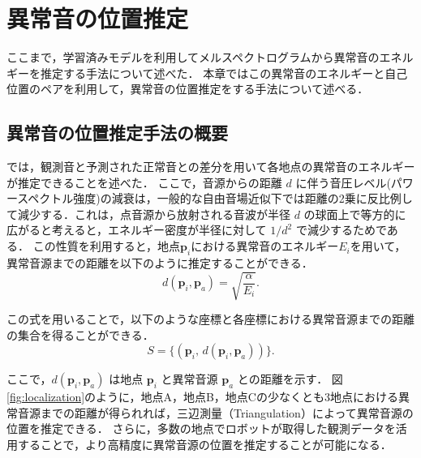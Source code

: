 \documentclass[../main]{subfiles}
\begin{document}
\section{異常音の位置推定}
\label{sec:pmethod_abnormal_detection}
ここまで，学習済みモデルを利用してメルスペクトログラムから異常音のエネルギーを推定する手法について述べた．
本章ではこの異常音のエネルギーと自己位置のペアを利用して，異常音の位置推定をする手法について述べる．

\subsection{異常音の位置推定手法の概要}
では，観測音と予測された正常音との差分を用いて各地点の異常音のエネルギーが推定できることを述べた．
ここで，音源からの距離 $d$ に伴う音圧レベル(パワースペクトル強度)の減衰は，一般的な自由音場近似下では距離の2乗に反比例して減少する．これは，点音源から放射される音波が半径 $d$ の球面上で等方的に広がると考えると，エネルギー密度が半径に対して $1/d^2$ で減少するためである．
この性質を利用すると，地点$\mathbf{p}_i$における異常音のエネルギー$E_i$を用いて，異常音源までの距離を以下のように推定することができる．
\begin{equation}
    d(\mathbf{p}_i, \mathbf{p}_a) = \sqrt{\frac{\alpha}{E_i}}.
    \label{eq:distance}
\end{equation}

この式を用いることで，以下のような座標と各座標における異常音源までの距離の集合を得ることができる．
\begin{equation}
    S = \{ (\mathbf{p}_i, \, d(\mathbf{p}_i,\mathbf{p}_a)) \}.
\end{equation}

ここで，$d(\mathbf{p}_i,\mathbf{p}_a)$ は地点 $\mathbf{p}_i$ と異常音源 $\mathbf{p}_a$ との距離を示す．
図\ref{fig:localization}のように，地点A，地点B，地点Cの少なくとも3地点における異常音源までの距離が得られれば，三辺測量（Triangulation）によって異常音源の位置を推定できる．
さらに，多数の地点でロボットが取得した観測データを活用することで，より高精度に異常音源の位置を推定することが可能になる．
\end{document}
